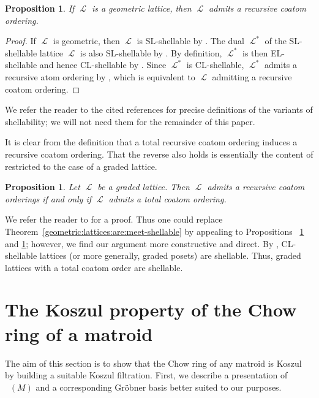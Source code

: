\documentclass[11pt, reqno]{amsart}
\DeclareMathOperator{\Chow}{\underline{CH}}		%
\DeclareMathOperator{\LL}{\mathcal{L}}
\newtheorem{prop}[thm]{Proposition}
\theoremstyle{definition}
\numberwithin{equation}{section}
\numberwithin{table}{section}
\begin{document}
\begin{spacing}{1.1}
\begin{prop}\label{rco}
If $\LL$ is a geometric lattice, then $\LL$ admits a recursive coatom ordering.
\end{prop}

\begin{proof}  If $\LL$ is geometric, then $\LL$ is SL-shellable by \cite[Theorem 3.7]{Bjo80}.  The dual $\LL^\ast$ of the  SL-shellable lattice  $\LL$ is also SL-shellable by \cite[Proposition 3.5]{Bjo80}.  By definition, $\LL^\ast$ is then EL-shellable \cite[Definition 3.4]{Bjo80} and hence CL-shellable by \cite[Proposition 2.3]{BW83}.  Since $\LL^\ast$ is CL-shellable, $\LL^\ast$ admits a recursive atom ordering by \cite[Theorem 5.11]{BW96a}, which is equivalent to $\LL$ admitting a recursive coatom ordering.
\end{proof}

\noindent We refer the reader to the cited references for precise definitions of the variants of shellability; we will not need them for the remainder of this paper.

It is clear from the definition that a total recursive coatom ordering induces a recursive coatom ordering.  That the reverse also holds is essentially the content of \cite[Lemma 2.10]{Del08} restricted to the case of a graded lattice.

\begin{prop}\label{Delucchi} Let $\LL$ be a graded lattice.  Then $\LL$  admits a recursive coatom orderings if and only if $\LL$ admits a total coatom ordering.
\end{prop}

\noindent We refer the reader to \cite{Del08} for a proof.  Thus one could replace Theorem~\ref{geometric:lattices:are:meet-shellable} by appealing to Propositions~ \ref{rco} and \ref{Delucchi}; however, we find our argument more constructive and direct.
By \cite[Theorem 3.3]{BW82}, CL-shellable lattices (or more generally, graded posets) are shellable.  Thus, graded lattices with a total coatom order are shellable.


\section{The Koszul property of the Chow ring of a matroid}\label{Smain}

The aim of this section is to show that the Chow ring of any matroid is Koszul by building a suitable Koszul filtration. First, we describe a presentation of $\Chow(M)$ and a corresponding Gr\"obner basis better suited to our purposes.


\end{spacing}
\end{document}
